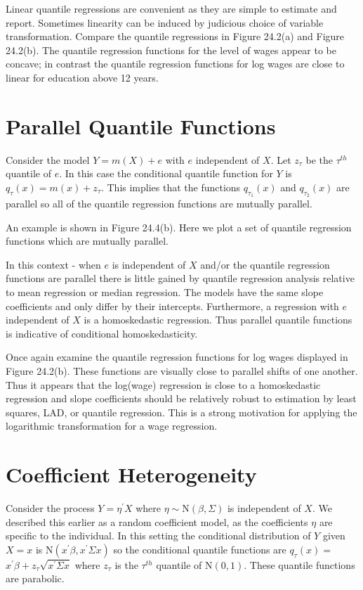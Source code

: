 \documentclass[10pt]{article}
\begin{document}
Linear quantile regressions are convenient as they are simple to estimate and report. Sometimes linearity can be induced by judicious choice of variable transformation. Compare the quantile regressions in Figure 24.2(a) and Figure 24.2(b). The quantile regression functions for the level of wages appear to be concave; in contrast the quantile regression functions for log wages are close to linear for education above 12 years.

\section{Parallel Quantile Functions}
Consider the model $Y=m(X)+e$ with $e$ independent of $X$. Let $z_{\tau}$ be the $\tau^{t h}$ quantile of $e$. In this case the conditional quantile function for $Y$ is $q_{\tau}(x)=m(x)+z_{\tau}$. This implies that the functions $q_{\tau_{1}}(x)$ and $q_{\tau_{2}}(x)$ are parallel so all of the quantile regression functions are mutually parallel.

An example is shown in Figure 24.4(b). Here we plot a set of quantile regression functions which are mutually parallel.

In this context - when $e$ is independent of $X$ and/or the quantile regression functions are parallel there is little gained by quantile regression analysis relative to mean regression or median regression. The models have the same slope coefficients and only differ by their intercepts. Furthermore, a regression with $e$ independent of $X$ is a homoskedastic regression. Thus parallel quantile functions is indicative of conditional homoskedasticity.

Once again examine the quantile regression functions for log wages displayed in Figure 24.2(b). These functions are visually close to parallel shifts of one another. Thus it appears that the log(wage) regression is close to a homoskedastic regression and slope coefficients should be relatively robust to estimation by least squares, LAD, or quantile regression. This is a strong motivation for applying the logarithmic transformation for a wage regression.

\section{Coefficient Heterogeneity}
Consider the process $Y=\eta^{\prime} X$ where $\eta \sim \mathrm{N}(\beta, \Sigma)$ is independent of $X$. We described this earlier as a random coefficient model, as the coefficients $\eta$ are specific to the individual. In this setting the conditional distribution of $Y$ given $X=x$ is $\mathrm{N}\left(x^{\prime} \beta, x^{\prime} \Sigma x\right)$ so the conditional quantile functions are $q_{\tau}(x)=$ $x^{\prime} \beta+z_{\tau} \sqrt{x^{\prime} \Sigma x}$ where $z_{\tau}$ is the $\tau^{t h}$ quantile of $\mathrm{N}(0,1)$. These quantile functions are parabolic.
\end{document}
